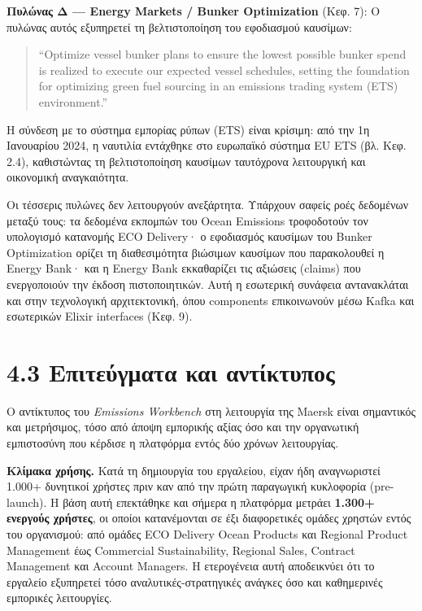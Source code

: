 \textbf{Πυλώνας Δ --- Energy Markets / Bunker Optimization} (Κεφ. 7): Ο
πυλώνας αυτός εξυπηρετεί τη βελτιστοποίηση του εφοδιασμού καυσίμων:

\begin{quote}
``Optimize vessel bunker plans to ensure the lowest possible bunker
spend is realized to execute our expected vessel schedules, setting the
foundation for optimizing green fuel sourcing in an emissions trading
system (ETS) environment.''
\end{quote}

Η σύνδεση με το σύστημα εμπορίας ρύπων (ETS) είναι κρίσιμη: από την 1η
Ιανουαρίου 2024, η ναυτιλία εντάχθηκε στο ευρωπαϊκό σύστημα EU ETS (βλ.
Κεφ. 2.4), καθιστώντας τη βελτιστοποίηση καυσίμων ταυτόχρονα λειτουργική
και οικονομική αναγκαιότητα.

Οι τέσσερις πυλώνες δεν λειτουργούν ανεξάρτητα. Υπάρχουν σαφείς ροές
δεδομένων μεταξύ τους: τα δεδομένα εκπομπών του Ocean Emissions
τροφοδοτούν τον υπολογισμό κατανομής ECO Delivery· ο εφοδιασμός καυσίμων
του Bunker Optimization ορίζει τη διαθεσιμότητα βιώσιμων καυσίμων που
παρακολουθεί η Energy Bank· και η Energy Bank εκκαθαρίζει τις αξιώσεις
(claims) που ενεργοποιούν την έκδοση πιστοποιητικών. Αυτή η εσωτερική
συνάφεια αντανακλάται και στην τεχνολογική αρχιτεκτονική, όπου
components επικοινωνούν μέσω Kafka και εσωτερικών Elixir interfaces
(Κεφ. 9).

\section{4.3 Επιτεύγματα και
αντίκτυπος}\label{ux3b5ux3c0ux3b9ux3c4ux3b5ux3cdux3b3ux3bcux3b1ux3c4ux3b1-ux3baux3b1ux3b9-ux3b1ux3bdux3c4ux3afux3baux3c4ux3c5ux3c0ux3bfux3c2}

Ο αντίκτυπος του \emph{Emissions Workbench} στη λειτουργία της Maersk
είναι σημαντικός και μετρήσιμος, τόσο από άποψη εμπορικής αξίας όσο και
την οργανωτική εμπιστοσύνη που κέρδισε η πλατφόρμα εντός δύο χρόνων
λειτουργίας.

\textbf{Κλίμακα χρήσης.} Κατά τη δημιουργία του εργαλείου, είχαν ήδη
αναγνωριστεί 1.000+ δυνητικοί χρήστες πριν καν από την πρώτη παραγωγική
κυκλοφορία (pre-launch). Η βάση αυτή επεκτάθηκε και σήμερα η πλατφόρμα
μετράει \textbf{1.300+ ενεργούς χρήστες}, οι οποίοι κατανέμονται σε έξι
διαφορετικές ομάδες χρηστών εντός του οργανισμού: από ομάδες ECO
Delivery Ocean Products και Regional Product Management έως Commercial
Sustainability, Regional Sales, Contract Management και Account
Managers. Η ετερογένεια αυτή αποδεικνύει ότι το εργαλείο εξυπηρετεί τόσο
αναλυτικές-στρατηγικές ανάγκες όσο και καθημερινές εμπορικές
λειτουργίες.


